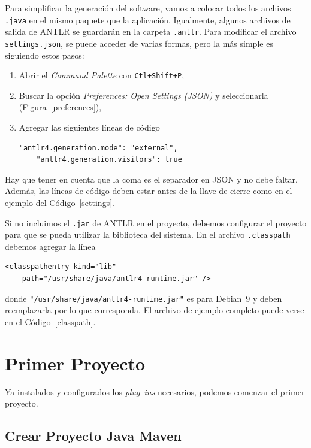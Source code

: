 \documentclass[a5paper,10pt]{article}
\begin{document}
Para simplificar la generación del software, vamos a colocar todos los archivos \verb|.java| en el mismo paquete que la aplicación.  Igualmente, algunos archivos de salida de ANTLR se guardarán en la carpeta \verb|.antlr|.  Para modificar el archivo \verb|settings.json|, se puede acceder de varias formas, pero la más simple es siguiendo estos pasos:
\begin{enumerate}
	\item Abrir el \emph{Command Palette} con \verb|Ctl+Shift+P|,
	\item Buscar la opción \emph{Preferences: Open Settings (JSON)} y seleccionarla (Figura~\ref{preferences}),
	\item Agregar las siguientes líneas de código
	\begin{lstlisting}[style=consola]
	"antlr4.generation.mode": "external",
	"antlr4.generation.visitors": true
	\end{lstlisting}
\end{enumerate}
Hay que tener en cuenta que la coma es el separador en JSON y no debe faltar.  Además, las líneas de código deben estar antes de la llave de cierre como en el ejemplo del Código~\ref{settings}.



Si no incluimos el \verb|.jar| de ANTLR en el proyecto, debemos configurar el proyecto para que se pueda utilizar la biblioteca del sistema.  En el archivo \verb|.classpath| debemos agregar la línea
\begin{lstlisting}[style=consola]
<classpathentry kind="lib"
    path="/usr/share/java/antlr4-runtime.jar" />	
\end{lstlisting}
donde \verb|"/usr/share/java/antlr4-runtime.jar"| es para Debian~9 y deben reemplazarla por lo que corresponda.  El archivo de ejemplo completo puede verse en el Código~\ref{classpath}.



\section{Primer Proyecto}
\label{primerproyecto}

Ya instalados y configurados los \emph{plug--ins} necesarios, podemos comenzar el primer proyecto.

\subsection{Crear Proyecto Java Maven}
\label{proyecto_maven}
\end{document}
